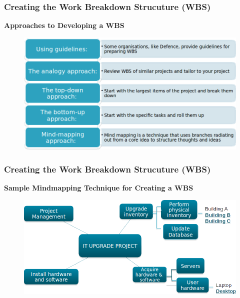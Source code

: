 \documentclass[aspectratio=169]{beamer}
\begin{document}

\begin{frame}
\frametitle{Creating the Work Breakdown Strucuture (WBS)}
\textbf{Approaches to Developing a WBS}
\begin{figure}
\includegraphics[scale=0.5]{wbs_approaches}
\end{figure}
\end{frame}


\begin{frame}
\frametitle{Creating the Work Breakdown Strucuture (WBS)}
\textbf{Sample Mindmapping Technique for Creating a WBS}
\vspace{0.5cm}
\begin{figure}
\includegraphics[scale=0.5]{mindmap_wbs}
\end{figure}
\end{frame}

\end{document}
